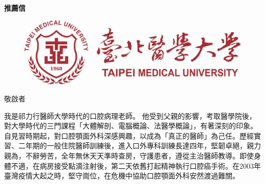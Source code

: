 \documentclass{letter}
\date{}
\begin{document}
\begin{letter}
{
\centering \Large \textbf{推薦信}%
}

\hfill
\begin{figure}%
    \includegraphics[width=0.2\textheight]{TMU_logo.jpg}
\end{figure}

\opening{敬啟者} %
\medskip 

\indent 我是祁力行醫師大學時代的口腔病理老師。%
他受到父親的影響，考取醫學院後，對大學時代的三門課程「大體解剖、電腦概論、法醫學概論」，有著深刻的印象。
自見習時期起，對口腔顎面外科深感興趣，以成為「真正的醫師」為己任。歷經實習、二年期的一般住院醫師訓練後，進入口外專科訓練長達四年，堅韌卓絕，親力親為，不辭勞苦，全年無休天天準時查房，守護患者，遵從主治醫師教導。即使身體不適，在病房接受點滴注射後，第二天依舊打起精神執行口腔癌手術。在2003年臺灣疫情大起之時，堅守崗位，在危機中協助口腔顎面外科安然渡過難關。




\end{letter}
\end{document}
